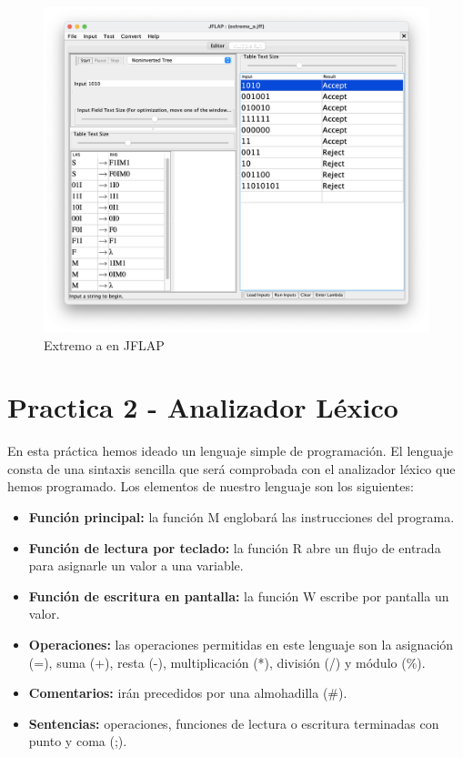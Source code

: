 \begin{figure}[H] 
	\centering
	\includegraphics[scale=0.35]{../practica_1/images/extremo_a.png} 
	\caption{Extremo a en JFLAP} 
    \label{fig:extremo_a}
\end{figure}

\newpage
\section{Practica 2 - Analizador Léxico}
En esta práctica hemos ideado un lenguaje simple de programación. El lenguaje consta de una sintaxis sencilla que será comprobada con el analizador léxico
que hemos programado. Los elementos de nuestro lenguaje son los siguientes:

\begin{itemize}
	\item \textbf{Función principal: } la función M englobará las instrucciones del programa.
	\item \textbf{Función de lectura por teclado: } la función R abre un flujo de entrada para asignarle un valor a una variable.
	\item \textbf{Función de escritura en pantalla: } la función W escribe por pantalla un valor.
	\item \textbf{Operaciones: } las operaciones permitidas en este lenguaje son la asignación (=), suma (+), resta (-), multiplicación (*), división (/) y módulo (\%).
	\item \textbf{Comentarios: } irán precedidos por una almohadilla (\#).
	\item \textbf{Sentencias: } operaciones, funciones de lectura o escritura terminadas con punto y coma (;).
\end{itemize}

